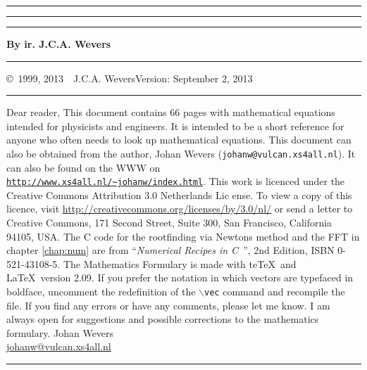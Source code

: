 \documentclass[twoside]{report}
\begin{document}
\thispagestyle{empty}
\hrule
\rule{.4pt}{22.35cm}\hspace*{161.62mm}\rule{.4pt}{22.35cm}
\vspace*{-17cm}
\begin{center}
\Huge
{}
\end{center}
\vspace{2cm}
\centerline{\Large\bf By ir. J.C.A. Wevers}
\vfill
\hrule
\newpage
\thispagestyle{empty}
\copyright~1999, 2013~~J.C.A. Wevers\hfill Version: September 2, 2013
\npar
\hrule
\par
\bigskip
Dear reader,
\npar
This document contains 66 pages with mathematical equations intended for
physicists and engineers. It is intended to be a short reference for anyone
who often needs to look up mathematical equations.
\npar
This document can also be obtained from the author, Johan Wevers ({\tt johanw@vulcan.xs4all.nl}).
\npar
It can also be found on the WWW on 
\href{http://www.xs4all.nl/~johanw}{\tt http://www.xs4all.nl/\~{}johanw/index.html}.
\npar
This work is licenced under the Creative Commons Attribution 3.0 Netherlands Lic
ense.
To view a copy of this licence, visit \href{http://creativecommons.org/licenseses/by/3.0/nl/}{http://creativecommons.org/licenses/by/3.0/nl/} or send a letter to Creative Commons, 171 Second Street, Suite 300,
San Francisco, California 94105, USA.
\npar
The C code for the rootfinding via Newtons method and the FFT in chapter
\ref{chap:num} are from ``{\it Numerical Recipes in C}~'', 2nd Edition,
ISBN 0-521-43108-5.
\npar
The Mathematics Formulary is made with te\TeX\ and \LaTeX\ version 2.09.
\npar
If you prefer the notation in which vectors are typefaced in boldface, uncomment
the redefinition of the {\tt $\backslash$vec} command and recompile the file.
\npar
If you find any errors or have any comments, please let me know. I am always
open for suggestions and possible corrections to the mathematics formulary.
\npar
Johan Wevers\\
\href{mailto:johanw@vulcan.xs4all.nl}{johanw@vulcan.xs4all.nl}
\vfill
\hrule

\newpage

\tableofcontents
\cleardoublepage


\renewcommand{\chaptermark}[1]{\markboth{#1}{#1}}
\end{document}
